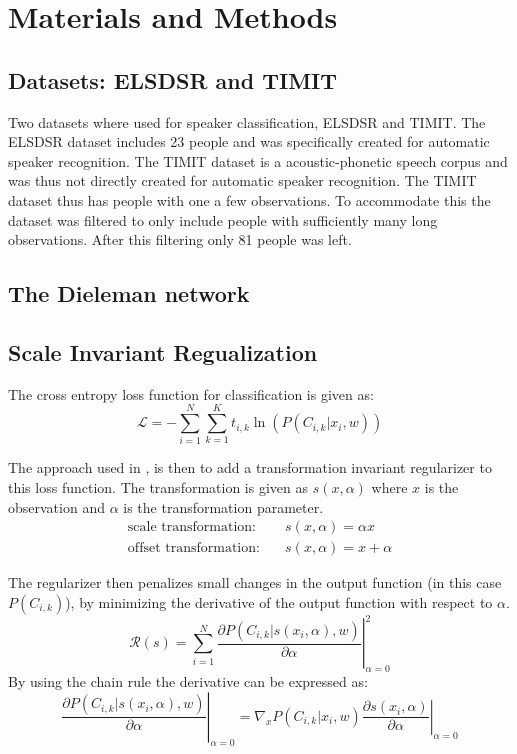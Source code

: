 \section{Materials and Methods}

\subsection{Datasets: ELSDSR and TIMIT}

Two datasets where used for speaker classification, ELSDSR and TIMIT. The ELSDSR dataset includes 23 people and was specifically created for automatic speaker recognition. The TIMIT dataset is a acoustic-phonetic speech corpus and was thus not directly created for automatic speaker recognition. The TIMIT dataset thus has people with one a few observations. To accommodate this the dataset was filtered to only include people with sufficiently many long observations. After this filtering only 81 people was left.

\subsection{The Dieleman network}


\subsection{Scale Invariant Regualization}

The cross entropy loss function for classification is given as:
\begin{equation}
\mathcal{L} = - \sum_{i=1}^N \sum_{k=1}^K t_{i,k} \ln(P(C_{i,k} | x_i, w))
\end{equation}

The approach used in \cite{scale-invariante}, is then to add a transformation invariant regularizer to this loss function. The transformation is given as $s(x, \alpha)$ where $x$ is the observation and $\alpha$ is the transformation parameter.
\begin{align}
\text{scale transformation:}&\quad s(x, \alpha) = \alpha x\\
\text{offset transformation:}&\quad s(x, \alpha) = x + \alpha
\end{align}

The regularizer then penalizes small changes in the output function (in this case $P(C_{i, k})$), by minimizing the derivative of the output function with respect to $\alpha$.
\begin{equation}
\mathcal{R}(s) = \sum_{i=1}^N \left. \frac{\partial P(C_{i, k} | s(x_i, \alpha), w)}{\partial \alpha} \right|^2_{\alpha=0}
\end{equation}
By using the chain rule the derivative can be expressed as:
\begin{equation*}
\left. \frac{\partial P(C_{i, k} | s(x_i, \alpha), w)}{\partial \alpha} \right|_{\alpha=0} = \left.\nabla_x P(C_{i, k} | x_i, w) \frac{\partial s(x_i, \alpha)}{\partial \alpha} \right|_{\alpha=0}
\end{equation*}

